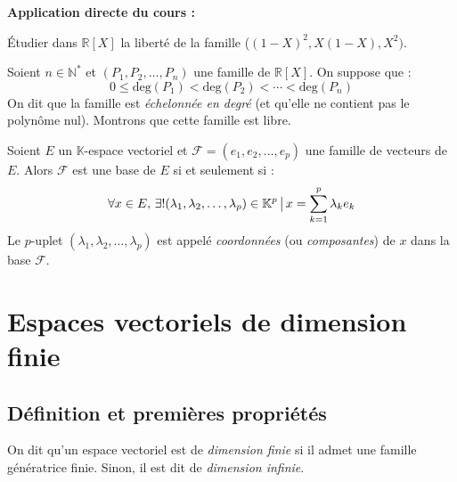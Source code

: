\documentclass[french,11pt,twoside]{VcCours}
\newenvironment{ApplicationDirecte}{\textbf{Application directe du cours :}

}{}
\begin{document}
\begin{ApplicationDirecte} Étudier dans $\mathbb{R}[X]$ la liberté de la famille ($(1-X)^2,X(1-X),X^2)$.
\end{ApplicationDirecte}
\begin{Exemple} Soient $n \in \mathbb{N}^*$ et $(P_1, P_2, \ldots, P_n)$ une famille de $\mathbb{R}[X]$. On suppose que :
$$ 0 \leq \textrm{deg}(P_1) < \textrm{deg}(P_2) < \cdots < \textrm{deg}(P_n)$$
On dit que la famille est \emph{échelonnée en degré} (et qu'elle ne contient pas le polynôme nul). Montrons que cette famille est libre.

\medskip
%
%

\vspace{9cm}
\end{Exemple}

\begin{TheoremeDefinition}{} 
Soient $E$ un $\mathbb{K}$-espace vectoriel et $\mathcal{F} = (e_1, e_2, \ldots, e_p)$ une famille de vecteurs de $E$. Alors $\mathcal{F}$ est une base de $E$ si et seulement si :
$$ \forall x \in E, \, \exists  ! (\lambda_1, \lambda_2, \ldots, \lambda_p) \in \mathbb{K}^p \, \big{\vert} \, x = \sum_{k=1}^p \lambda_k e_k$$
Le $p$-uplet $(\lambda_1, \lambda_2, \ldots, \lambda_p)$ est appelé \emph{coordonnées} (ou \emph{composantes}) de $x$ dans la base $\mathcal{F}$.
\end{TheoremeDefinition}

\section{Espaces vectoriels de dimension finie}
 \subsection{Définition et premières propriétés}
 \begin{Definition}{} On dit qu'un espace vectoriel est de \emph{dimension finie} si il admet une famille génératrice finie. Sinon, il est dit de \emph{dimension infinie}.
 \end{Definition}
 
\end{document}
